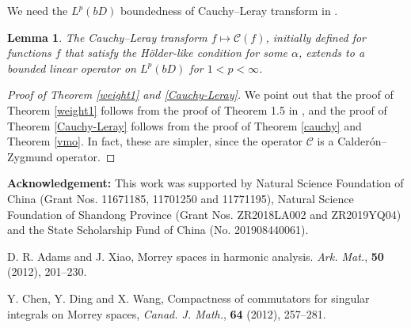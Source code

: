 \documentclass[11pt,a4paper]{amsart}
\numberwithin{equation}{section}
\newtheorem{lemma}[theorem]{Lemma}
\begin{document}
{We need the $L^p(bD)$ boundedness of Cauchy--Leray transform in \cite[Theorem 5.1]{LS2014}.

\begin{lemma}%
The Cauchy--Leray transform $f\mapsto \mathcal C(f)$, initially defined for functions $f$ that satisfy the H\"older-like condition for some $\alpha$, extends to a bounded linear operator on $L^p(bD)$ for $1<p<\infty$.
\end{lemma}



\begin{proof}[Proof of Theorem \ref {weight1} and \ref {Cauchy-Leray}]
We point out that the proof of Theorem \ref {weight1} follows from the proof of Theorem 1.5 in \cite{DLLW}, and the proof of Theorem \ref {Cauchy-Leray} follows from the proof of Theorem \ref {cauchy} and Theorem \ref{vmo}. In fact, these are simpler, since the operator $\mathcal C$ is a Calder\'on--Zygmund operator.
\end{proof}

\color{black}

\bigskip

{\bf Acknowledgement:} This work was supported by Natural Science Foundation
of China (Grant Nos. 11671185, 11701250 and 11771195), Natural Science Foundation of Shandong
Province (Grant Nos. ZR2018LA002 and ZR2019YQ04) and the State Scholarship Fund of China (No. 201908440061).





\begin{thebibliography}{10}

 D. R. Adams and J. Xiao,  Morrey spaces in harmonic analysis. {\it Ark. Mat.},  {\bf50} (2012),  201--230.

%
%
%
%
%
%

Y. Chen, Y. Ding and X. Wang, Compactness of commutators for singular integrals on
Morrey spaces, {\it Canad. J. Math.}, {\bf 64} (2012), 257--281.



\end{thebibliography}}
\end{document}
